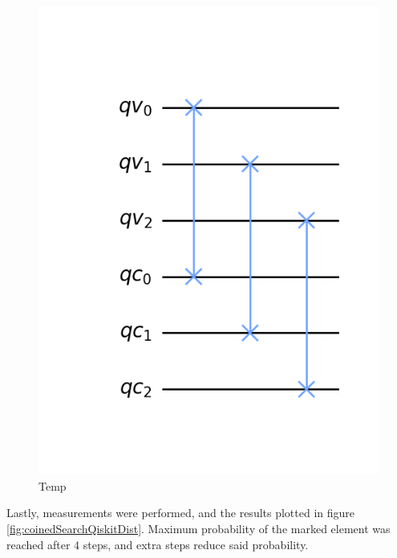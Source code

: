 \documentclass[../../dissertation.tex]{subfiles}
\begin{document}
\begin{figure}[!h]
	\centering
	\includegraphics[scale=0.27]{img/Qiskit/CoinedQuantumWalk/Search/Circuits/CoinedSearchQiskitCircShift_N3_M4_S5.png}
	\caption{Temp} 
	\label{fig:coinedQWSearchShiftCircuitQistkit}
\end{figure}\par
Lastly, measurements were performed, and the results plotted in figure \ref{fig:coinedSearchQiskitDist}. Maximum probability of the marked element was reached after $4$ steps, and extra steps reduce said probability. 
\end{document}
